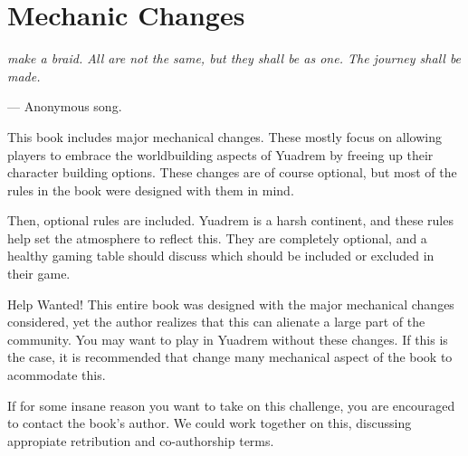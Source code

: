 \chapter{Mechanic Changes}
\begin{linenumbers}
\textit{make a braid. All are not the same, but they shall be as one.
The journey shall be made.}

\hspace*{\fill} --- Anonymous song.

This book includes major mechanical changes.
These mostly focus on allowing players to embrace the worldbuilding aspects of Yuadrem by freeing up their character building options.
These changes are of course optional, but most of the rules in the book were designed with them in mind.

Then, optional rules are included.
Yuadrem is a harsh continent, and these rules help set the atmosphere to reflect this.
They are completely optional, and a healthy gaming table should discuss which should be included or excluded in their game.

\begin{DndComment}{Help Wanted!}
    This entire book was designed with the major mechanical changes considered, yet the author realizes that this can alienate a large part of the community.
    You may want to play in Yuadrem without these changes.
    If this is the case, it is recommended that change many mechanical aspect of the book to acommodate this.

    If for some insane reason you want to take on this challenge, you are encouraged to contact the book's author.
    We could work together on this, discussing appropiate retribution and co-authorship terms.
\end{DndComment}


\end{linenumbers}
